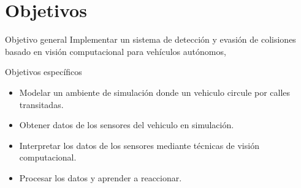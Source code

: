\documentclass[8pt]{beamer}
\begin{document}
    
    \section{Objetivos}
    \begin{frame}{Objetivo general}
        Implementar un sistema de detección y evasión de colisiones basado en visión computacional para vehículos autónomos,
    \end{frame}
    \begin{frame}{Objetivos específicos}
        \begin{itemize}
            \item Modelar un ambiente de simulación donde un vehiculo circule por calles transitadas.
            \item Obtener datos de los sensores del vehiculo en simulación.
            \item Interpretar los datos de los sensores mediante técnicas de visión computacional.
            \item Procesar los datos y aprender a reaccionar.
        \end{itemize}
    \end{frame}
    
\end{document}
